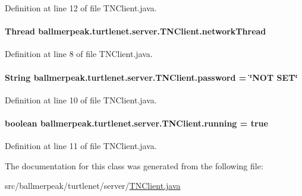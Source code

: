 Definition at line 12 of file T\-N\-Client.\-java.

\hypertarget{classballmerpeak_1_1turtlenet_1_1server_1_1TNClient_a30362e2dd295df5ecaadc7fed3374ea0}{
\paragraph[{network\-Thread}]{\setlength{\rightskip}{0pt plus 5cm}Thread ballmerpeak.\-turtlenet.\-server.\-T\-N\-Client.\-network\-Thread}}\label{classballmerpeak_1_1turtlenet_1_1server_1_1TNClient_a30362e2dd295df5ecaadc7fed3374ea0}


Definition at line 8 of file T\-N\-Client.\-java.

\hypertarget{classballmerpeak_1_1turtlenet_1_1server_1_1TNClient_a9307f6efc05ddda37f9355b6f13953d9}{
\paragraph[{password}]{\setlength{\rightskip}{0pt plus 5cm}String ballmerpeak.\-turtlenet.\-server.\-T\-N\-Client.\-password = \char`\"{}N\-O\-T S\-E\-T\char`\"{}}}\label{classballmerpeak_1_1turtlenet_1_1server_1_1TNClient_a9307f6efc05ddda37f9355b6f13953d9}


Definition at line 10 of file T\-N\-Client.\-java.

\hypertarget{classballmerpeak_1_1turtlenet_1_1server_1_1TNClient_af8bbdf5ff58fedc8c99ef82b17654a94}{
\paragraph[{running}]{\setlength{\rightskip}{0pt plus 5cm}boolean ballmerpeak.\-turtlenet.\-server.\-T\-N\-Client.\-running = true}}\label{classballmerpeak_1_1turtlenet_1_1server_1_1TNClient_af8bbdf5ff58fedc8c99ef82b17654a94}


Definition at line 11 of file T\-N\-Client.\-java.



The documentation for this class was generated from the following file\-:\begin{DoxyCompactItemize}
\item 
src/ballmerpeak/turtlenet/server/\hyperlink{TNClient_8java}{T\-N\-Client.\-java}\end{DoxyCompactItemize}
